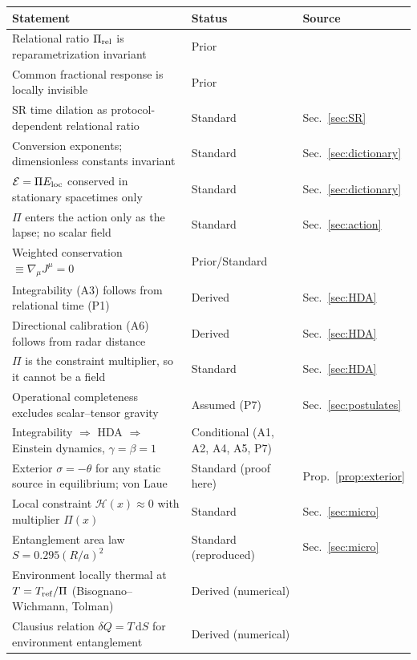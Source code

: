 \documentclass[11pt]{article}
\newcommand{\Pg}{\Pi}                 %
\newcommand{\thP}{\theta}             %
\newcommand{\sgP}{\sigma}             %
\newcommand{\Eloc}{E_{\rm loc}}       %
\newcommand{\Eref}{\mathcal{E}}       %
\newcommand{\dd}{\mathrm{d}}
\theoremstyle{plain}
\theoremstyle{definition}
\theoremstyle{remark}
\begin{document}
\begin{longtable}{@{}>{\raggedright\arraybackslash}p{}>{\raggedright\arraybackslash}p{}>{\raggedright\arraybackslash}p{}@{}}
\toprule
Statement & Status & Source \\
\midrule
Relational ratio $\Pg_{\rm rel}$ is reparametrization invariant & Prior & \cite{JordanHDA} \\
Common fractional response is locally invisible & Prior & \cite{JordanClocks} \\
SR time dilation as protocol-dependent relational ratio & Standard & Sec.~\ref{sec:SR} \\
Conversion exponents; dimensionless constants invariant & Standard & Sec.~\ref{sec:dictionary} \\
$\Eref=\Pg\Eloc$ conserved in stationary spacetimes only & Standard & Sec.~\ref{sec:dictionary} \\
$\Pg$ enters the action only as the lapse; no scalar field & Standard & Sec.~\ref{sec:action} \\
Weighted conservation $\equiv\nabla_\mu J^\mu=0$ & Prior/Standard & \cite{JordanHDA,JordanGeometry} \\
Integrability (A3) follows from relational time (P1) & Derived & Sec.~\ref{sec:HDA} \\
Directional calibration (A6) follows from radar distance & Derived & Sec.~\ref{sec:HDA} \\
$\Pg$ is the constraint multiplier, so it cannot be a field & Standard & Sec.~\ref{sec:HDA} \\
Operational completeness excludes scalar--tensor gravity & Assumed (P7) & Sec.~\ref{sec:postulates} \\
Integrability $\Rightarrow$ HDA $\Rightarrow$ Einstein dynamics, $\gamma=\beta=1$ & Conditional (A1, A2, A4, A5, P7) & \cite{JordanHDA,HKT1976} \\
Exterior $\sgP=-\thP$ for any static source in equilibrium; von Laue & Standard (proof here) & Prop.~\ref{prop:exterior} \\
Local constraint $\mathcal H(x)\approx0$ with multiplier $\Pg(x)$ & Standard & Sec.~\ref{sec:micro} \\
Entanglement area law $S=0.295(R/a)^2$ & Standard (reproduced) & Sec.~\ref{sec:micro} \\
Environment locally thermal at $T=T_{\rm ref}/\Pg$ (Bisognano--Wichmann, Tolman) & Derived (numerical) & \cite{JordanNote3} \\
Clausius relation $\delta Q=T\,\dd S$ for environment entanglement & Derived (numerical) & \cite{JordanNote3} \\

\end{longtable}
\end{document}
